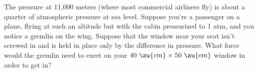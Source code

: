 The pressure at 11,000 meters (where most commercial airliners fly) is
about a quarter of atmospheric pressure at sea level. Suppose you're a
passenger on a plane, flying at such an altitude but with the cabin
pressurized to 1 atm, and you notice a gremlin on the wing. Suppose
that the window near your seat isn't screwed in and is held in place
only by the difference in pressure.  What force would the gremlin need
to exert on your $40\ \zu{cm}\times 50\ \zu{cm}$ window in order to
get in? \answercheck
